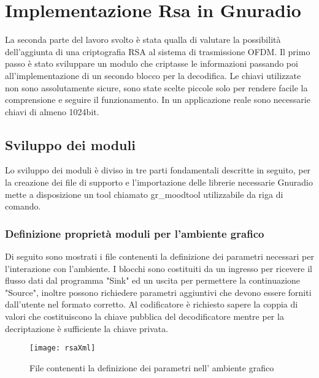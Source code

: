 \chapter{Implementazione Rsa in Gnuradio}
\label{cha:999}
La seconda parte del lavoro svolto è stata qualla di valutare la possibilità dell'aggiunta di una criptografia RSA al sistema di trasmissione OFDM. Il primo passo è stato sviluppare un modulo che criptasse le informazioni passando poi all'implementazione di un secondo blocco per la decodifica. Le chiavi utilizzate non sono assolutamente sicure, sono state scelte piccole solo per rendere facile la comprensione e seguire il funzionamento. In un applicazione reale sono necessarie chiavi di almeno 1024bit.
\section{Sviluppo dei moduli}
Lo sviluppo dei moduli è diviso in tre parti fondamentali descritte in seguito, per la creazione dei file di supporto e l'importazione delle librerie necessarie Gnuradio mette a disposizione un tool chiamato gr\_moodtool utilizzabile da riga di comando.
\subsection{Definizione proprietà moduli per l'ambiente grafico}
Di seguito sono mostrati i file contenenti la definizione dei parametri necessari per l'interazione con l'ambiente. I blocchi sono costituiti da un ingresso per ricevere il flusso dati dal programma "Sink" ed un uscita per permettere la continuazione "Source", inoltre possono richiedere parametri aggiuntivi che devono essere forniti dall'utente nel formato corretto.
Al codificatore è richiesto sapere la coppia di valori che costituiscono la chiave pubblica del decodificatore mentre per la decriptazione è sufficiente la chiave privata.
\begin{figure}[h]
	\centering
	\texttt{[image: rsaXml]}
	\caption{File contenenti la definizione dei parametri nell' ambiente grafico}
\end{figure}
